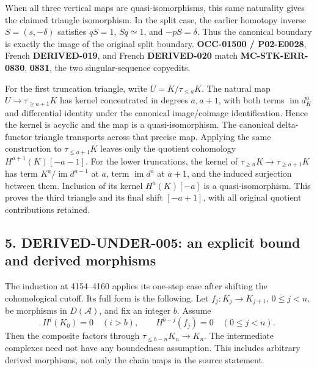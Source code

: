 When all three vertical maps are quasi-isomorphisms,\allowbreak{} this same naturality gives the claimed triangle isomorphism. In the split case,\allowbreak{} the earlier homotopy inverse \(S=(s,-\delta)\) satisfies \(qS=1\),\allowbreak{} \(Sq\simeq1\),\allowbreak{} and \(-pS=\delta\). Thus the canonical boundary is exactly the image of the original split boundary. \textbf{OCC-01500 /\allowbreak{} P02-E0028},\allowbreak{} French \textbf{DERIVED-019},\allowbreak{} and French \textbf{DERIVED-020} match \textbf{MC-STK-ERR-0830},\allowbreak{} \textbf{0831},\allowbreak{} the two singular-sequence copyedits.

For the first truncation triangle,\allowbreak{} write \(U=K/\tau_{\leq a}K\). The natural map \(U\to\tau_{\geq a+1}K\) has kernel concentrated in degrees \(a,a+1\),\allowbreak{} with both terms \(\operatorname{im}d_K^a\) and differential identity under the canonical image/\allowbreak{}coimage identification. Hence the kernel is acyclic and the map is a quasi-isomorphism. The canonical delta-functor triangle transports across that precise map. Applying the same construction to \(\tau_{\leq a+1}K\) leaves only the quotient cohomology \(H^{a+1}(K)[-a-1]\). For the lower truncations,\allowbreak{} the kernel of \(\tau_{\geq a}K\to\tau_{\geq a+1}K\) has term \(K^a/\operatorname{im}d^{a-1}\) at \(a\),\allowbreak{} term \(\operatorname{im}d^a\) at \(a+1\),\allowbreak{} and the induced surjection between them. Inclusion of its kernel \(H^a(K)[-a]\) is a quasi-isomorphism. This proves the third triangle and its final shift \([-a+1]\),\allowbreak{} with all original quotient contributions retained.

\subsection{\texorpdfstring{5. DERIVED-UNDER-005:\allowbreak{} an explicit bound and derived morphisms}{5.  an explicit bound and derived morphisms}}\label{proofs-3487-4161-derived-under-005-an-explicit-bound-and-derived-morphisms}

The induction at 4154–\allowbreak{}4160 applies its one-step case after shifting the cohomological cutoff. Its full form is the following. Let \(f_j:K_j\to K_{j+1}\),\allowbreak{} \(0\leq j<n\),\allowbreak{} be morphisms in \(D(\mathcal A)\),\allowbreak{} and fix an integer \(b\). Assume \[
H^i(K_0)=0\quad(i>b),\qquad H^{b-j}(f_j)=0\quad(0\leq j<n).
\] Then the composite factors through \(\tau_{\leq b-n}K_n\to K_n\). The intermediate complexes need not have any boundedness assumption. This includes arbitrary derived morphisms,\allowbreak{} not only the chain maps in the source statement.

